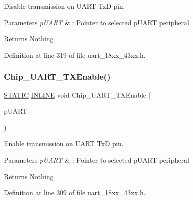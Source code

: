 Disable transmission on U\+A\+RT TxD pin. 


\begin{DoxyParams}{Parameters}
{\em p\+U\+A\+RT} & \+: Pointer to selected p\+U\+A\+RT peripheral \\
\hline
\end{DoxyParams}
\begin{DoxyReturn}{Returns}
Nothing 
\end{DoxyReturn}


Definition at line 319 of file uart\+\_\+18xx\+\_\+43xx.\+h.

\mbox{\label{group___u_a_r_t__18_x_x__43_x_x_ga6220ec27deb21fff77fac8fe82890ad2}} 
\subsubsection{\texorpdfstring{Chip\+\_\+\+U\+A\+R\+T\+\_\+\+T\+X\+Enable()}{Chip\_UART\_TXEnable()}}
{\footnotesize\ttfamily \hyperlink{group___l_p_c___types___public___macros_ga10b2d890d871e1489bb02b7e70d9bdfb}{S\+T\+A\+T\+IC} \hyperlink{spifi__18xx__43xx_8h_a2eb6f9e0395b47b8d5e3eeae4fe0c116}{I\+N\+L\+I\+NE} void Chip\+\_\+\+U\+A\+R\+T\+\_\+\+T\+X\+Enable (\begin{DoxyParamCaption}\item[{\hyperlink{struct_l_p_c___u_s_a_r_t___t}{L\+P\+C\+\_\+\+U\+S\+A\+R\+T\+\_\+T} $\ast$}]{p\+U\+A\+RT }\end{DoxyParamCaption})}



Enable transmission on U\+A\+RT TxD pin. 


\begin{DoxyParams}{Parameters}
{\em p\+U\+A\+RT} & \+: Pointer to selected p\+U\+A\+RT peripheral \\
\hline
\end{DoxyParams}
\begin{DoxyReturn}{Returns}
Nothing 
\end{DoxyReturn}


Definition at line 309 of file uart\+\_\+18xx\+\_\+43xx.\+h.

